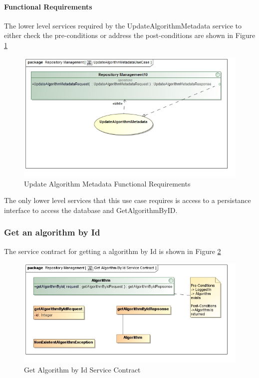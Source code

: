 \paragraph{Functional Requirements}
The lower level services required by the UpdateAlgorithmMetadata service to either check the
pre-conditions or address the post-conditions are shown in Figure \ref{fig:UpdateAlgorithmMetadataUseCase}
\begin{figure}[H]
	\begin{center}
		\includegraphics[scale=0.6]{../Diagrams and Charts/Test Data/UpdateAlgorithmMetadataUseCase.jpg}
		\caption{Update Algorithm Metadata Functional Requirements}
		\label{fig:UpdateAlgorithmMetadataUseCase}
	\end{center}
\end{figure}

The only lower level services that this use case requires is access to
a persistance interface to access the database and GetAlgorithmByID.

\subsubsection {Get an algorithm by Id}
The service contract for getting a algorithm by Id is shown in Figure \ref{fig:getAlgoByIdService}
\begin{figure}[H]
  \begin{center}
  \includegraphics[scale=0.6]{../Diagrams and Charts/Test Data/Get Algorithm By Id Service Contract.jpg}
  \caption{Get Algorithm by Id Service Contract}
  \label{fig:getAlgoByIdService}
  \end{center}
  
\end{figure}

